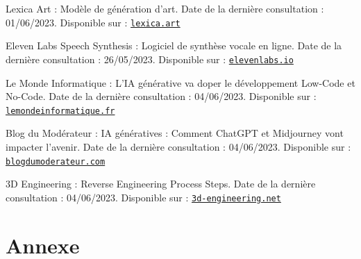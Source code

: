 \documentclass[11,5pt]{report}
\begin{document}
\begin{spacing}{2}
\begin{spacing}{2}
\begin{thebibliography}{6}
  Lexica Art :  Modèle de génération d'art. Date de la dernière consultation : 01/06/2023. Disponible sur : \href{https://lexica.art}{\nolinkurl{lexica.art}}
  
  Eleven Labs Speech Synthesis : Logiciel de synthèse vocale en ligne. Date de la dernière consultation : 26/05/2023. Disponible sur : 
  \href{https://beta.elevenlabs.io/speech-synthesis}{\nolinkurl{elevenlabs.io}}

  Le Monde Informatique : L'IA générative va doper le développement Low-Code et No-Code. Date de la dernière consultation : 04/06/2023. Disponible sur : \href{https://www.lemondeinformatique.fr/actualites/lire-l-ia-generative-va-doper-le-developpement-low-code-et-no-code-90245.html}{\nolinkurl{lemondeinformatique.fr}}

  Blog du Modérateur : IA génératives : Comment ChatGPT et Midjourney vont impacter l'avenir. Date de la dernière consultation : 04/06/2023. Disponible sur : \href{https://www.blogdumoderateur.com/ia-generatives-comment-chatgpt-midjourney-vont-impacter-avenir/}{\nolinkurl{blogdumoderateur.com}}

  3D Engineering : Reverse Engineering Process Steps. Date de la dernière consultation : 04/06/2023. Disponible sur : \href{https://3d-engineering.net/reverse-engineering-process-steps/}{\nolinkurl{3d-engineering.net}}
  
\end{thebibliography}

\appendix
\chapter*{\fontsize{30}{18}\selectfont Annexe}


\end{spacing}
\end{spacing}
\end{document}
